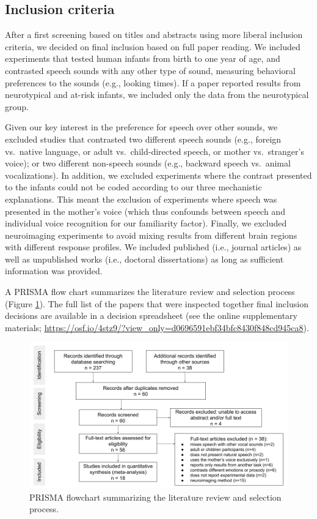 \documentclass[
  man]{apa6}
\begin{document}
\hypertarget{inclusion-criteria}{%
\subsection{Inclusion criteria}\label{inclusion-criteria}}

After a first screening based on titles and abstracts using more liberal inclusion criteria, we decided on final inclusion based on full paper reading. We included experiments that tested human infants from birth to one year of age, and contrasted speech sounds with any other type of sound, measuring behavioral preferences to the sounds (e.g., looking times). If a paper reported results from neurotypical and at-risk infants, we included only the data from the neurotypical group.

Given our key interest in the preference for speech over other sounds, we excluded studies that contrasted two different speech sounds (e.g., foreign vs.~native language, or adult vs.~child-directed speech, or mother vs.~stranger's voice); or two different non-speech sounds (e.g., backward speech vs.~animal vocalizations). In addition, we excluded experiments where the contrast presented to the infants could not be coded according to our three mechanistic explanations. This meant the exclusion of experiments where speech was presented in the mother's voice (which thus confounds between speech and individual voice recognition for our familiarity factor). Finally, we excluded neuroimaging experiments to avoid mixing results from different brain regions with different response profiles. We included published (i.e., journal articles) as well as unpublished works (i.e., doctoral dissertations) as long as sufficient information was provided.

A PRISMA flow chart summarizes the literature review and selection process (Figure \ref{fig:prisma}). The full list of the papers that were inspected together final inclusion decisions are available in a decision spreadsheet (see the online supplementary materials; \url{https://osf.io/4stz9/?view_only=d0696591ebf34bfc8430f848cd945ca8}).

\begin{figure}
\centering
\includegraphics{figures_intro/PRISMA.png}
\caption{\label{fig:prisma}PRISMA flowchart summarizing the literature review and selection process.}
\end{figure}
\end{document}
